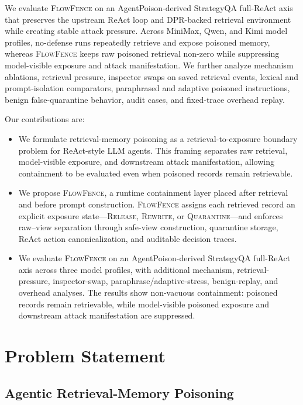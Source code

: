 \documentclass[11pt]{article}
\newcommand{\ff}{\textsc{FlowFence}\xspace}
\begin{document}
We evaluate \ff on an AgentPoison-derived StrategyQA full-ReAct axis that preserves the upstream ReAct loop and DPR-backed retrieval environment while creating stable attack pressure. Across MiniMax, Qwen, and Kimi model profiles, no-defense runs repeatedly retrieve and expose poisoned memory, whereas \ff keeps raw poisoned retrieval non-zero while suppressing model-visible exposure and attack manifestation. We further analyze mechanism ablations, retrieval pressure, inspector swaps on saved retrieval events, lexical and prompt-isolation comparators, paraphrased and adaptive poisoned instructions, benign false-quarantine behavior, audit cases, and fixed-trace overhead replay.

Our contributions are:
\begin{itemize}
    \item We formulate retrieval-memory poisoning as a retrieval-to-exposure boundary problem for ReAct-style LLM agents. This framing separates raw retrieval, model-visible exposure, and downstream attack manifestation, allowing containment to be evaluated even when poisoned records remain retrievable.

    \item We propose \textsc{FlowFence}, a runtime containment layer placed after retrieval and before prompt construction. \textsc{FlowFence} assigns each retrieved record an explicit exposure state---\textsc{Release}, \textsc{Rewrite}, or \textsc{Quarantine}---and enforces raw--view separation through safe-view construction, quarantine storage, ReAct action canonicalization, and auditable decision traces.

    \item We evaluate \textsc{FlowFence} on an AgentPoison-derived StrategyQA full-ReAct axis across three model profiles, with additional mechanism, retrieval-pressure, inspector-swap, paraphrase/adaptive-stress, benign-replay, and overhead analyses. The results show non-vacuous containment: poisoned records remain retrievable, while model-visible poisoned exposure and downstream attack manifestation are suppressed.
\end{itemize}

\section{Problem Statement}

\subsection{Agentic Retrieval-Memory Poisoning}
\end{document}
